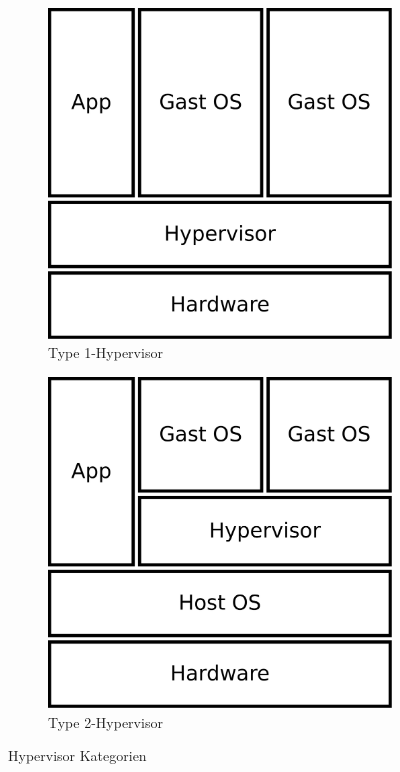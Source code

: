 \documentclass[
  a4paper,					    %
  twoside,
  DIV=calc,     				%
  bibliography=totoc,
  cleardoublepage=empty,
  ngerman,     					%
  final       					%
]{scrbook}
\begin{document}
\begin{figure}
    \centering
    \begin{subfigure}[b]{0.4\textwidth}
        \centering
        \includegraphics[width=\textwidth]{virt_type1}
        \caption{Type 1-Hypervisor}
        \label{fig:hypervisor_type1}
    \end{subfigure}
    \qquad
    \begin{subfigure}[b]{0.4\textwidth}
        \centering
        \includegraphics[width=\textwidth]{virt_type2}
        \caption{Type 2-Hypervisor}
        \label{fig:hypervisor_type2}
    \end{subfigure}
    \caption{Hypervisor Kategorien}
    \label{fig:hypervisor}
\end{figure}
\end{document}

